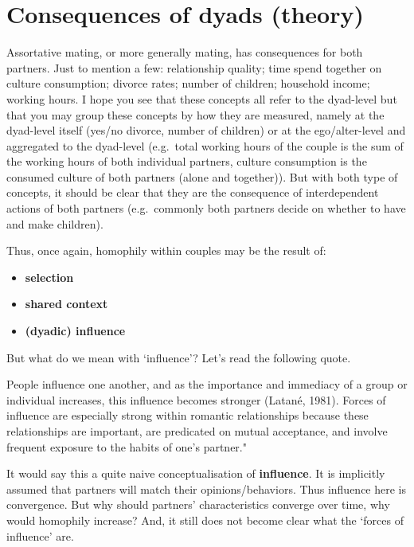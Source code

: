 \documentclass[
]{book}
\providecommand{\tightlist}{%
  \setlength{\itemsep}{0pt}\setlength{\parskip}{0pt}}
\begin{document}
\hypertarget{consequences-of-dyads-theory}{%
\section{Consequences of dyads (theory)}\label{consequences-of-dyads-theory}}

Assortative mating, or more generally mating, has consequences for both partners. Just to mention a few: relationship quality; time spend together on culture consumption; divorce rates; number of children; household income; working hours. I hope you see that these concepts all refer to the dyad-level but that you may group these concepts by how they are measured, namely at the dyad-level itself (yes/no divorce, number of children) or at the ego/alter-level and aggregated to the dyad-level (e.g.~total working hours of the couple is the sum of the working hours of both individual partners, culture consumption is the consumed culture of both partners (alone and together)). But with both type of concepts, it should be clear that they are the consequence of interdependent actions of both partners (e.g.~commonly both partners decide on whether to have and make children).

Thus, once again, homophily within couples may be the result of:

\begin{itemize}
\tightlist
\item
  \textbf{selection}\\
\item
  \textbf{shared context}
\item
  \textbf{(dyadic) influence}
\end{itemize}

But what do we mean with `influence'? Let's read the following quote.

People influence one another, and as the importance and immediacy of a group or individual increases, this influence becomes stronger (Latané, 1981). Forces of influence are especially strong within romantic relationships because these relationships are important, are predicated on mutual acceptance, and involve frequent exposure to the habits of one's partner." \citet{bartel2017romantic}

It would say this a quite naive conceptualisation of \textbf{influence}. It is implicitly assumed that partners will match their opinions/behaviors. Thus influence here is convergence. But why should partners' characteristics converge over time, why would homophily increase? And, it still does not become clear what the `forces of influence' are.
\end{document}
